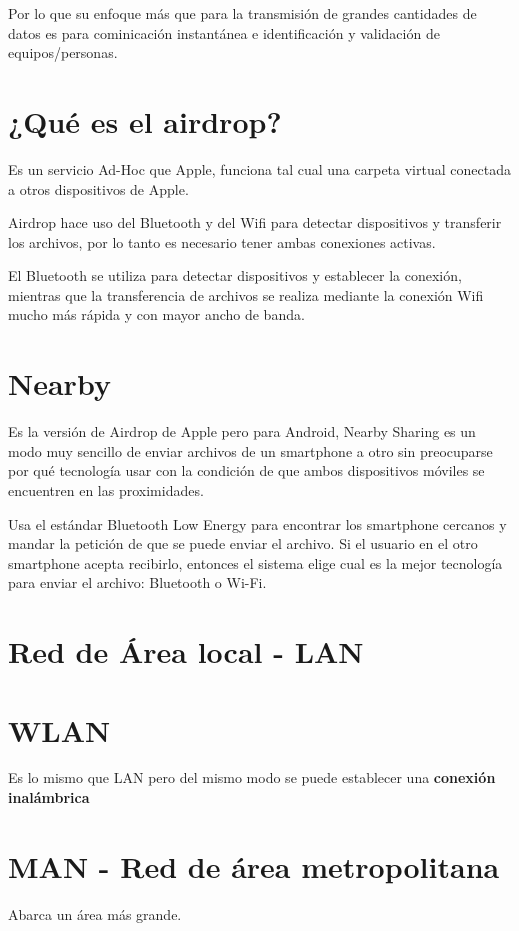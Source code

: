 \documentclass[letterpaper,12pt]{article}
\begin{document}
\begin{sloppypar}
Por lo que su enfoque más que para la transmisión de grandes cantidades de datos es para cominicación instantánea e identificación y validación de equipos/personas.

\section{¿Qué es el airdrop?}
Es un servicio Ad-Hoc que Apple, funciona tal cual una carpeta virtual conectada a otros dispositivos de Apple. 

Airdrop hace uso del Bluetooth y del Wifi para detectar dispositivos y transferir los archivos, por lo tanto es necesario tener ambas conexiones activas.

El Bluetooth se utiliza para detectar dispositivos y establecer la conexión, mientras que la transferencia de archivos se realiza mediante la conexión Wifi mucho más rápida y con mayor ancho de banda.

\section{Nearby}
Es la versión de Airdrop de Apple pero para Android, Nearby Sharing es un modo muy sencillo de enviar archivos de un smartphone a otro sin preocuparse por qué tecnología usar con la condición de que ambos dispositivos móviles se encuentren en las proximidades. 

Usa el estándar Bluetooth Low Energy para encontrar los smartphone cercanos y mandar la petición de que se puede enviar el archivo. Si el usuario en el otro smartphone acepta recibirlo, entonces el sistema elige cual es la mejor tecnología para enviar el archivo: Bluetooth o Wi-Fi.

\section{Red de Área local - LAN}

\section{WLAN}
Es lo mismo que LAN pero del mismo modo se puede establecer una \textbf{conexión inalámbrica}

\section{MAN - Red de área metropolitana}
Abarca un área más grande. 


\end{sloppypar}
\end{document}
